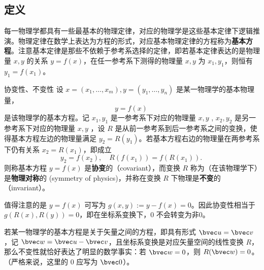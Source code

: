 \subsection{定义}
每一物理学都具有一些最基本的物理定律，对应的物理学是这些基本定律下逻辑推演。物理定律在数学上表达为方程的形式，对应基本物理定律的方程称为\textbf{基本方程}。注意基本定律是那些不依赖于参考系选择的定律，即若基本定律表达的是物理量 $x,y$ 的关系 $y=f(x)$，在任一参考系下测得的物理量 $x,y$ 为 $x_1,y_1$，则恒有 $y_1=f(x_1)$。
\begin{definition}{协变性、不变性}\label{def_CoIn_1}
设 $x=(x_1,\ldots,x_m),y=(y_1,\ldots,y_n)$ 是某一物理学的基本物理量，
\begin{equation}
y=f(x)~
\end{equation}
是该物理学的基本方程。记 $x_1,y_1$ 是一参考系下对应的物理量 $x,y$ , $x_2,y_2$ 是另一参考系下对应的物理量 $x,y$ ，设 $R$ 是从前一参考系到后一参考系之间的变换，使得基本方程左边的物理量满足 $y_2=R(y_1)$。若基本方程右边的物理量在两参考系下仍有关系 $x_2=R(x_1)$，即成立
\begin{equation}
y_2=f(x_2),\quad R(f(x_1))=f(R(x_1)).~
\end{equation}
则称基本方程 $y=f(x)$ 是\textbf{协变}的（covariant），而变换 $R$ 称为（在该物理学下）是\textbf{物理对称}的 (symmetry of physics)，并称在变换 $R$ 下物理是\textbf{不变}的（invariant）。
\end{definition}

值得注意的是 $y=f(x)$ 可写为 $g(x,y):=y-f(x)=0$。因此协变性相当于 $g(R(x),R(y))=0$，即在坐标系变换下，$0$ 不会转变为非0。
\begin{example}{}
若某一物理学的基本方程是关于矢量之间的方程，即具有形式 $\bvec u=\bvec v$，记 $\bvec w=\bvec u-\bvec v$，且坐标系变换是对应矢量空间的线性变换 $R$，那么不变性就恰好表达了明显的数学事实：若 $\bvec w=0$，则 $R(\bvec w)=0$。（严格来说，这里的 0 应写为 $\bvec 0$）。
\end{example}














